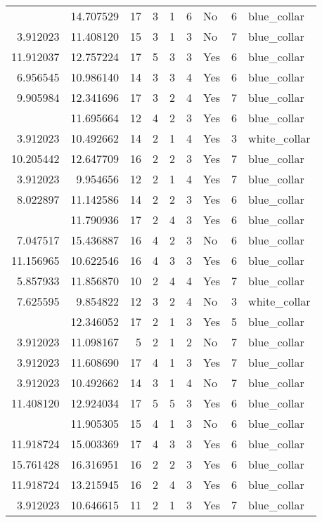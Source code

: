 \documentclass[
]{article}
\begin{document}
\begin{longtable}[t]{rrrrrllrl}
\addlinespace
3.912023 & 14.707529 & 17 & 3 & 1 & 6 & No & 6 & blue\_collar\\
3.912023 & 11.408120 & 15 & 3 & 1 & 3 & No & 7 & blue\_collar\\
11.912037 & 12.757224 & 17 & 5 & 3 & 3 & Yes & 6 & blue\_collar\\
6.956545 & 10.986140 & 14 & 3 & 3 & 4 & Yes & 6 & blue\_collar\\
9.905984 & 12.341696 & 17 & 3 & 2 & 4 & Yes & 7 & blue\_collar\\
\addlinespace
9.905984 & 11.695664 & 12 & 4 & 2 & 3 & Yes & 6 & blue\_collar\\
3.912023 & 10.492662 & 14 & 2 & 1 & 4 & Yes & 3 & white\_collar\\
10.205442 & 12.647709 & 16 & 2 & 2 & 3 & Yes & 7 & blue\_collar\\
3.912023 & 9.954656 & 12 & 2 & 1 & 4 & Yes & 7 & blue\_collar\\
8.022897 & 11.142586 & 14 & 2 & 2 & 3 & Yes & 6 & blue\_collar\\
\addlinespace
7.467371 & 11.790936 & 17 & 2 & 4 & 3 & Yes & 6 & blue\_collar\\
7.047517 & 15.436887 & 16 & 4 & 2 & 3 & No & 6 & blue\_collar\\
11.156965 & 10.622546 & 16 & 4 & 3 & 3 & Yes & 6 & blue\_collar\\
5.857933 & 11.856870 & 10 & 2 & 4 & 4 & Yes & 7 & blue\_collar\\
7.625595 & 9.854822 & 12 & 3 & 2 & 4 & No & 3 & white\_collar\\
\addlinespace
3.912023 & 12.346052 & 17 & 2 & 1 & 3 & Yes & 5 & blue\_collar\\
3.912023 & 11.098167 & 5 & 2 & 1 & 2 & No & 7 & blue\_collar\\
3.912023 & 11.608690 & 17 & 4 & 1 & 3 & Yes & 7 & blue\_collar\\
3.912023 & 10.492662 & 14 & 3 & 1 & 4 & No & 7 & blue\_collar\\
11.408120 & 12.924034 & 17 & 5 & 5 & 3 & Yes & 6 & blue\_collar\\
\addlinespace
3.912023 & 11.905305 & 15 & 4 & 1 & 3 & No & 6 & blue\_collar\\
11.918724 & 15.003369 & 17 & 4 & 3 & 3 & Yes & 6 & blue\_collar\\
15.761428 & 16.316951 & 16 & 2 & 2 & 3 & Yes & 6 & blue\_collar\\
11.918724 & 13.215945 & 16 & 2 & 4 & 3 & Yes & 6 & blue\_collar\\
3.912023 & 10.646615 & 11 & 2 & 1 & 3 & Yes & 7 & blue\_collar\\

\end{longtable}
\end{document}
